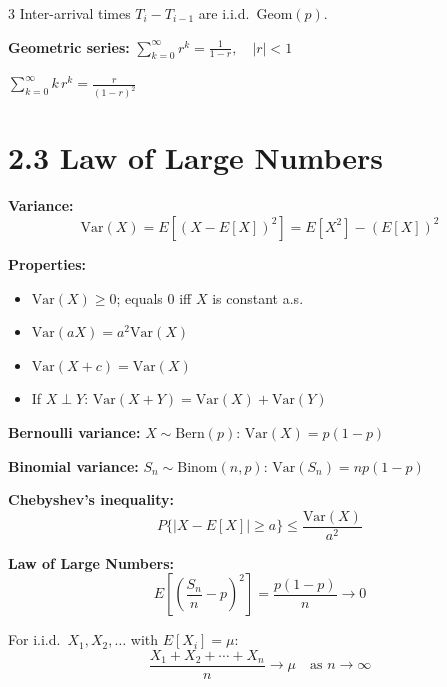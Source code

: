 \documentclass[10pt,landscape]{article}
\begin{document}
\begin{multicols}{3}
Inter-arrival times $T_i - T_{i-1}$ are i.i.d.\ $\text{Geom}(p)$.

\textbf{Geometric series:}
$\displaystyle \sum_{k=0}^{\infty} r^k = \frac{1}{1-r}, \quad |r| < 1$

$\displaystyle \sum_{k=0}^{\infty} k\,r^k = \frac{r}{(1-r)^2}$

\section*{2.3 Law of Large Numbers}

\textbf{Variance:}
\[
  \text{Var}(X) = E\!\left[(X - E[X])^2\right] = E[X^2] - (E[X])^2
\]

\textbf{Properties:}
\begin{itemize}[nosep, leftmargin=1.2em]
  \item $\text{Var}(X) \geq 0$; equals $0$ iff $X$ is constant a.s.
  \item $\text{Var}(aX) = a^2 \text{Var}(X)$
  \item $\text{Var}(X + c) = \text{Var}(X)$
  \item If $X \perp Y$: $\text{Var}(X + Y) = \text{Var}(X) + \text{Var}(Y)$
\end{itemize}

\textbf{Bernoulli variance:} $X \sim \text{Bern}(p)$: $\text{Var}(X) = p(1-p)$

\textbf{Binomial variance:} $S_n \sim \text{Binom}(n,p)$: $\text{Var}(S_n) = np(1-p)$

\textbf{Chebyshev's inequality:}
\[
  P\{|X - E[X]| \geq a\} \leq \frac{\text{Var}(X)}{a^2}
\]

\textbf{Law of Large Numbers:}
\[
  E\!\left[\left(\frac{S_n}{n} - p\right)^{\!2}\right] = \frac{p(1-p)}{n} \to 0
\]

For i.i.d.\ $X_1, X_2, \ldots$ with $E[X_i] = \mu$:
\[
  \frac{X_1 + X_2 + \cdots + X_n}{n} \xrightarrow{\text{}} \mu \quad \text{as } n \to \infty
\]

\end{multicols}
\end{document}
